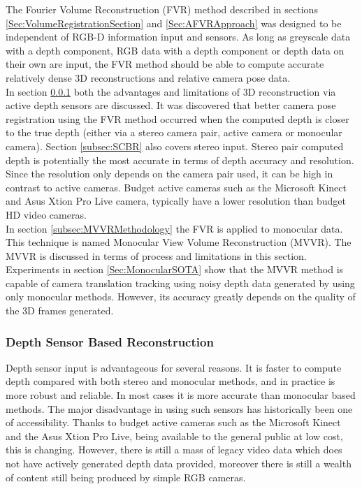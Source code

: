 
The Fourier Volume Reconstruction (FVR) method described in sections \ref{Sec:VolumeRegistrationSection} and \ref{Sec:AFVRApproach} was designed to be independent of RGB-D information input and sensors. As long as greyscale data with a depth component, RGB data with a depth component or depth data on their own are input, the FVR method should be able to compute accurate relatively dense 3D reconstructions and relative camera pose data. \\

In section \ref{subsec:DSBR} both the advantages and limitations of 3D reconstruction via active depth sensors are discussed. It was discovered that better camera pose registration using the FVR method occurred when the computed depth is closer to the true depth (either via a stereo camera pair, active camera or monocular camera). Section \ref{subsec:SCBR} also covers stereo input. Stereo pair computed depth is potentially the most accurate in terms of depth accuracy and resolution. Since the resolution only depends on the camera pair used, it can be high in contrast to active cameras. Budget active cameras such as the Microsoft Kinect and Asus Xtion Pro Live camera, typically have a lower resolution than budget HD video cameras. \\

In section \ref{subsec:MVVRMethodology} the FVR is applied to monocular data. This technique is named Monocular View Volume Reconstruction (MVVR). The MVVR is discussed in terms of process and limitations in this section. Experiments in section \ref{Sec:MonocularSOTA} show that the MVVR method is capable of camera translation tracking using noisy depth data generated by using only monocular methods. However, its accuracy greatly depends on the quality of the 3D frames generated. \\

\subsubsection{Depth Sensor Based Reconstruction}
\label{subsec:DSBR}

Depth sensor input is advantageous for several reasons. It is faster to compute depth compared with both stereo and monocular methods, and in practice is more robust and reliable. In most cases it is more accurate than monocular based methods. The major disadvantage in using such sensors has historically been one of accessibility. Thanks to budget active cameras such as the Microsoft Kinect and the Asus Xtion Pro Live, being available to the general public at low cost, this is changing. However, there is still a mass of legacy video data which does not have actively generated depth data provided, moreover there is still a wealth of content still being produced by simple RGB cameras. \\

